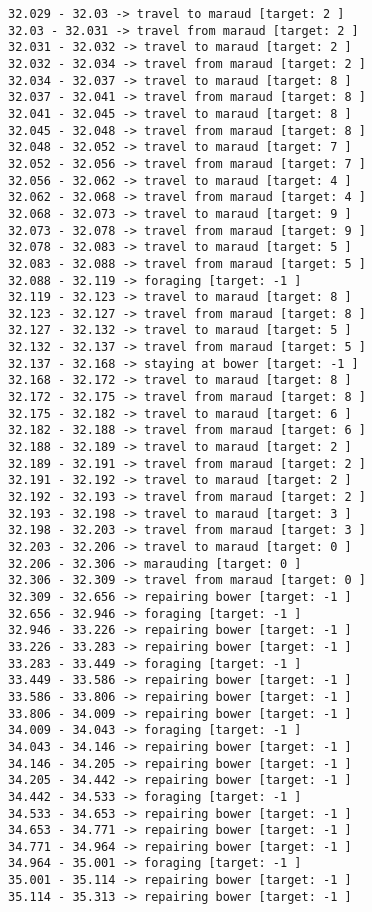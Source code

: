 \documentclass[11pt]{article}
\begin{document}
\begin{Verbatim}[commandchars=\\\{\}]
32.029 - 32.03 -> travel to maraud [target: 2 ]
32.03 - 32.031 -> travel from maraud [target: 2 ]
32.031 - 32.032 -> travel to maraud [target: 2 ]
32.032 - 32.034 -> travel from maraud [target: 2 ]
32.034 - 32.037 -> travel to maraud [target: 8 ]
32.037 - 32.041 -> travel from maraud [target: 8 ]
32.041 - 32.045 -> travel to maraud [target: 8 ]
32.045 - 32.048 -> travel from maraud [target: 8 ]
32.048 - 32.052 -> travel to maraud [target: 7 ]
32.052 - 32.056 -> travel from maraud [target: 7 ]
32.056 - 32.062 -> travel to maraud [target: 4 ]
32.062 - 32.068 -> travel from maraud [target: 4 ]
32.068 - 32.073 -> travel to maraud [target: 9 ]
32.073 - 32.078 -> travel from maraud [target: 9 ]
32.078 - 32.083 -> travel to maraud [target: 5 ]
32.083 - 32.088 -> travel from maraud [target: 5 ]
32.088 - 32.119 -> foraging [target: -1 ]
32.119 - 32.123 -> travel to maraud [target: 8 ]
32.123 - 32.127 -> travel from maraud [target: 8 ]
32.127 - 32.132 -> travel to maraud [target: 5 ]
32.132 - 32.137 -> travel from maraud [target: 5 ]
32.137 - 32.168 -> staying at bower [target: -1 ]
32.168 - 32.172 -> travel to maraud [target: 8 ]
32.172 - 32.175 -> travel from maraud [target: 8 ]
32.175 - 32.182 -> travel to maraud [target: 6 ]
32.182 - 32.188 -> travel from maraud [target: 6 ]
32.188 - 32.189 -> travel to maraud [target: 2 ]
32.189 - 32.191 -> travel from maraud [target: 2 ]
32.191 - 32.192 -> travel to maraud [target: 2 ]
32.192 - 32.193 -> travel from maraud [target: 2 ]
32.193 - 32.198 -> travel to maraud [target: 3 ]
32.198 - 32.203 -> travel from maraud [target: 3 ]
32.203 - 32.206 -> travel to maraud [target: 0 ]
32.206 - 32.306 -> marauding [target: 0 ]
32.306 - 32.309 -> travel from maraud [target: 0 ]
32.309 - 32.656 -> repairing bower [target: -1 ]
32.656 - 32.946 -> foraging [target: -1 ]
32.946 - 33.226 -> repairing bower [target: -1 ]
33.226 - 33.283 -> repairing bower [target: -1 ]
33.283 - 33.449 -> foraging [target: -1 ]
33.449 - 33.586 -> repairing bower [target: -1 ]
33.586 - 33.806 -> repairing bower [target: -1 ]
33.806 - 34.009 -> repairing bower [target: -1 ]
34.009 - 34.043 -> foraging [target: -1 ]
34.043 - 34.146 -> repairing bower [target: -1 ]
34.146 - 34.205 -> repairing bower [target: -1 ]
34.205 - 34.442 -> repairing bower [target: -1 ]
34.442 - 34.533 -> foraging [target: -1 ]
34.533 - 34.653 -> repairing bower [target: -1 ]
34.653 - 34.771 -> repairing bower [target: -1 ]
34.771 - 34.964 -> repairing bower [target: -1 ]
34.964 - 35.001 -> foraging [target: -1 ]
35.001 - 35.114 -> repairing bower [target: -1 ]
35.114 - 35.313 -> repairing bower [target: -1 ]

\end{Verbatim}
\end{document}
